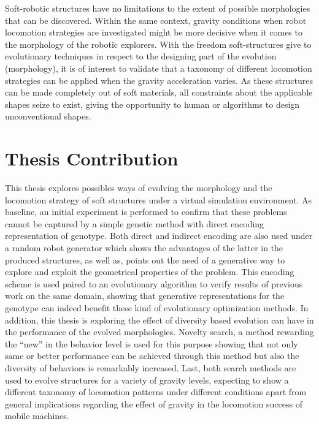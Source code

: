 Soft-robotic structures have no limitations to the extent of possible morphologies that can be discovered. Within the same context, gravity conditions when robot locomotion strategies are investigated might be more decisive when it comes to the morphology of the robotic explorers. With the freedom soft-structures give to evolutionary techniques in respect to the designing part of the evolution (morphology), it is of interest to validate that a taxonomy of different locomotion strategies can be applied when the gravity acceleration varies. As these structures can be made completely out of soft materials, all constraints about the applicable shapes seize to exist, giving the opportunity to human or algorithms to design unconventional shapes.



\section{Thesis Contribution}

This thesis explores possibles ways of evolving the morphology and the locomotion strategy of soft structures under a virtual simulation environment. As baseline, an initial experiment is performed to confirm that these problems cannot be captured by a simple genetic method with direct encoding representation of genotype. Both direct and indirect encoding are also used under a random robot generator which shows the advantages of the latter in the produced structures, as well as, points out the need of a generative way to explore and exploit the geometrical properties of the problem. This encoding scheme is used paired to an evolutionary algorithm to verify results of previous work on the same domain, showing that generative representations for the genotype can indeed benefit these kind of evolutionary optimization methods. In addition, this thesis is exploring the effect of diversity based evolution can have in the performance of the evolved morphologies. Novelty search, a method rewarding the ``new'' in the behavior level is used for this purpose showing that not only same or better performance can be achieved through this method but also the diversity of behaviors is remarkably increased. Last, both search methods are used to evolve structures for a variety of gravity levels, expecting to show a different taxonomy of locomotion patterns under different conditions apart from general implications regarding the effect of gravity in the locomotion success of mobile machines.






